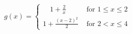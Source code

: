 \documentclass[preview]{standalone}
\begin{document}
\begin{align*}
g(x) = \begin{cases}
                \quad 1+ \frac{2}{x} &\text{ for } 1 \leq x \leq 2 \\
                1 + \frac{(x-2)^2}{2} &\text{ for } 2 < x \leq 4
            \end{cases}
\end{align*}
\end{document}

